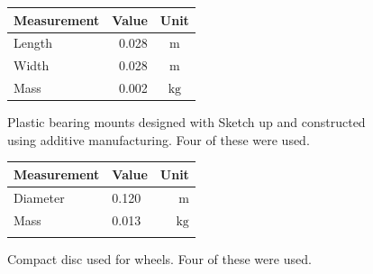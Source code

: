 \documentclass[a4paper]{article}
\begin{document}
\begin{figure}[h]
	\centering
	\begin{minipage}[t]{0.45\textwidth}
		\centering
		
		\begin{tabular}{p{3.5cm}rc}
			\toprule
			Measurement & Value & Unit \\
			\midrule
			Length & 0.028 & $\si{\meter}$ \\
			Width & 0.028 & $\si{\meter}$ \\
			Mass & 0.002 & $\si{\kilogram}$ \\
			\bottomrule
		\end{tabular}
		
		\vspace{0.5cm}
		
		\caption{Plastic bearing mounts designed with Sketch up and constructed using additive manufacturing. Four of these were used.}
	\end{minipage}
	\hspace{1cm}
	\begin{minipage}[t]{0.45\textwidth}
		\centering
		
		\begin{tabular}{p{3.5cm}lr}
			\toprule
			Measurement & Value & Unit \\
			\midrule
			Diameter & 0.120 & $\si{\meter}$ \\
			Mass & 0.013 & $\si{\kilogram}$ \\
			 & & \\
			\bottomrule
		\end{tabular}
		
		\vspace{0.5cm}
		
		\caption{Compact disc used for wheels. Four of these were used.}
	\end{minipage}
\end{figure}
\end{document}
